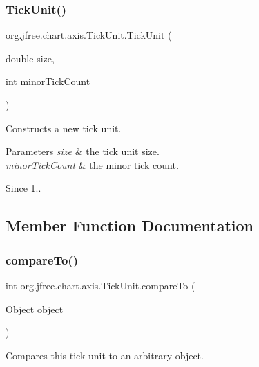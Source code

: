 \subsubsection{\texorpdfstring{Tick\+Unit()}{TickUnit()}\hspace{0.1cm}{\footnotesize\ttfamily [2/2]}}
{\footnotesize\ttfamily org.\+jfree.\+chart.\+axis.\+Tick\+Unit.\+Tick\+Unit (\begin{DoxyParamCaption}\item[{double}]{size,  }\item[{int}]{minor\+Tick\+Count }\end{DoxyParamCaption})}

Constructs a new tick unit.


\begin{DoxyParams}{Parameters}
{\em size} & the tick unit size. \\
\hline
{\em minor\+Tick\+Count} & the minor tick count.\\
\hline
\end{DoxyParams}
\begin{DoxySince}{Since}
1.. 
\end{DoxySince}


\subsection{Member Function Documentation}
\mbox{\label{classorg_1_1jfree_1_1chart_1_1axis_1_1_tick_unit_a544d66ed4908ad6b77e70029a8d1fc64}} 
\subsubsection{\texorpdfstring{compare\+To()}{compareTo()}}
{\footnotesize\ttfamily int org.\+jfree.\+chart.\+axis.\+Tick\+Unit.\+compare\+To (\begin{DoxyParamCaption}\item[{Object}]{object }\end{DoxyParamCaption})}

Compares this tick unit to an arbitrary object.


